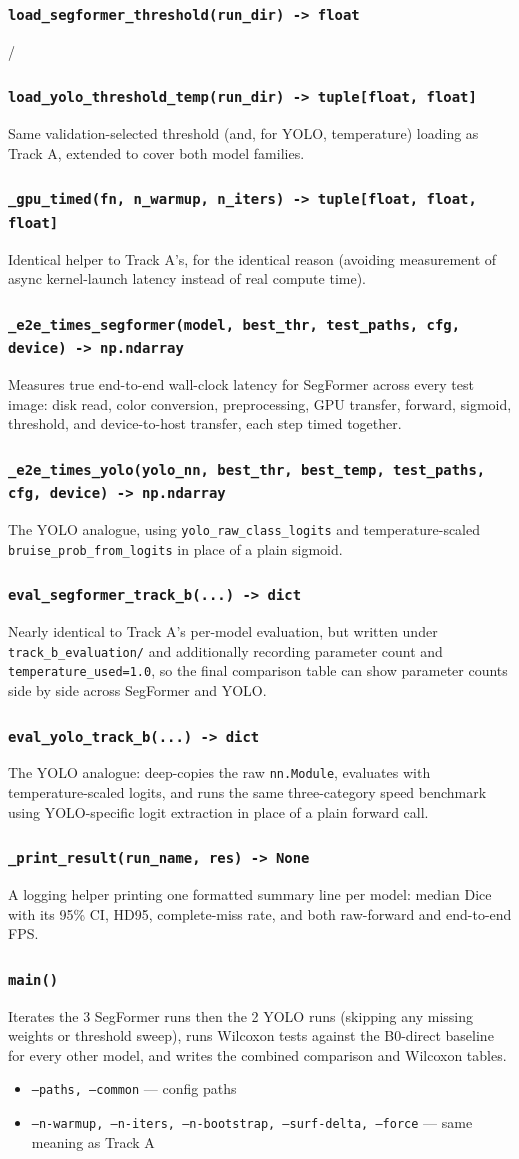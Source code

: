 \documentclass[11pt]{article}
\newcommand{\func}[1]{\subsubsection*{\texttt{#1}}}
\newcommand{\cliarg}[2]{\item \texttt{#1} --- #2}
\begin{document}
\func{load\_segformer\_threshold(run\_dir) -> float} / \func{load\_yolo\_threshold\_temp(run\_dir) -> tuple[float, float]}
Same validation-selected threshold (and, for YOLO, temperature) loading as
Track A, extended to cover both model families.

\func{\_gpu\_timed(fn, n\_warmup, n\_iters) -> tuple[float, float, float]}
Identical helper to Track A's, for the identical reason (avoiding measurement
of async kernel-launch latency instead of real compute time).

\func{\_e2e\_times\_segformer(model, best\_thr, test\_paths, cfg, device) -> np.ndarray}
Measures true end-to-end wall-clock latency for SegFormer across every test
image: disk read, color conversion, preprocessing, GPU transfer, forward,
sigmoid, threshold, and device-to-host transfer, each step timed together.

\func{\_e2e\_times\_yolo(yolo\_nn, best\_thr, best\_temp, test\_paths, cfg, device) -> np.ndarray}
The YOLO analogue, using \texttt{yolo\_raw\_class\_logits} and
temperature-scaled \texttt{bruise\_prob\_from\_logits} in place of a plain
sigmoid.

\func{eval\_segformer\_track\_b(...) -> dict}
Nearly identical to Track A's per-model evaluation, but written under
\texttt{track\_b\_evaluation/} and additionally recording parameter count and
\texttt{temperature\_used=1.0}, so the final comparison table can show
parameter counts side by side across SegFormer and YOLO.

\func{eval\_yolo\_track\_b(...) -> dict}
The YOLO analogue: deep-copies the raw \texttt{nn.Module}, evaluates with
temperature-scaled logits, and runs the same three-category speed benchmark
using YOLO-specific logit extraction in place of a plain forward call.

\func{\_print\_result(run\_name, res) -> None}
A logging helper printing one formatted summary line per model: median Dice
with its 95\% CI, HD95, complete-miss rate, and both raw-forward and
end-to-end FPS.

\func{main()}
Iterates the 3 SegFormer runs then the 2 YOLO runs (skipping any missing
weights or threshold sweep), runs Wilcoxon tests against the B0-direct
baseline for every other model, and writes the combined comparison and
Wilcoxon tables.

\begin{itemize}[nosep]
\cliarg{--paths, --common}{config paths}
\cliarg{--n-warmup, --n-iters, --n-bootstrap, --surf-delta, --force}{same meaning as Track A}
\end{itemize}
\end{document}
